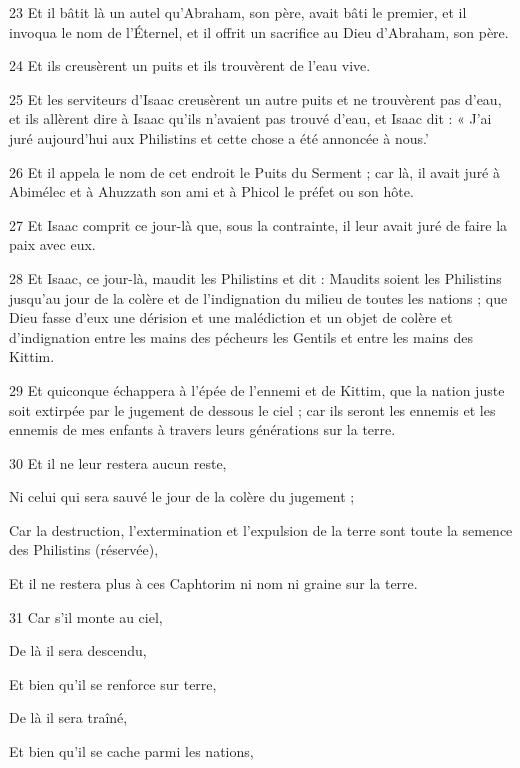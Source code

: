 \par 23 Et il bâtit là un autel qu'Abraham, son père, avait bâti le premier, et il invoqua le nom de l'Éternel, et il offrit un sacrifice au Dieu d'Abraham, son père.
\par 24 Et ils creusèrent un puits et ils trouvèrent de l'eau vive.
\par 25 Et les serviteurs d'Isaac creusèrent un autre puits et ne trouvèrent pas d'eau, et ils allèrent dire à Isaac qu'ils n'avaient pas trouvé d'eau, et Isaac dit : « J'ai juré aujourd'hui aux Philistins et cette chose a été annoncée à nous.'
\par 26 Et il appela le nom de cet endroit le Puits du Serment ; car là, il avait juré à Abimélec et à Ahuzzath son ami et à Phicol le préfet ou son hôte.
\par 27 Et Isaac comprit ce jour-là que, sous la contrainte, il leur avait juré de faire la paix avec eux.
\par 28 Et Isaac, ce jour-là, maudit les Philistins et dit : Maudits soient les Philistins jusqu'au jour de la colère et de l'indignation du milieu de toutes les nations ; que Dieu fasse d'eux une dérision et une malédiction et un objet de colère et d'indignation entre les mains des pécheurs les Gentils et entre les mains des Kittim.
\par 29 Et quiconque échappera à l'épée de l'ennemi et de Kittim, que la nation juste soit extirpée par le jugement de dessous le ciel ; car ils seront les ennemis et les ennemis de mes enfants à travers leurs générations sur la terre.
\par    
\par 30 Et il ne leur restera aucun reste,  
\par     Ni celui qui sera sauvé le jour de la colère du jugement ;  
\par     Car la destruction, l'extermination et l'expulsion de la terre sont toute la semence des Philistins (réservée),  
\par     Et il ne restera plus à ces Caphtorim ni nom ni graine sur la terre.
\par    
\par 31 Car s'il monte au ciel,  
\par     De là il sera descendu,
\par    
\par     Et bien qu'il se renforce sur terre,  
\par     De là il sera traîné,
\par    
\par     Et bien qu'il se cache parmi les nations,  
